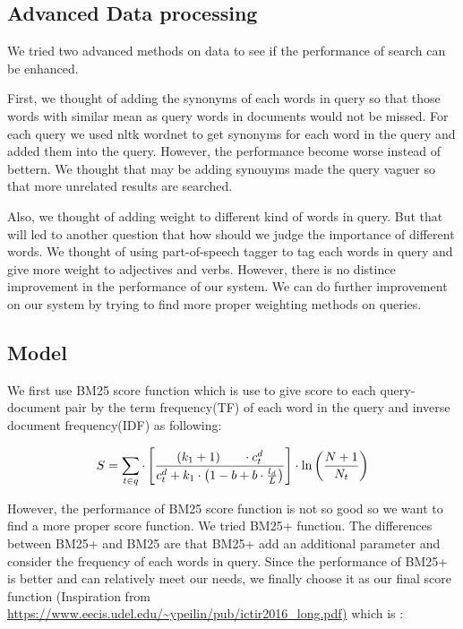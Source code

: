 \documentclass[letterpaper,10pt]{article}
\begin{document}
\begin{multicols}{2}
    \subsection{Advanced Data processing}

    We tried two advanced methods on data to see if the performance of search can be enhanced.
    
    First, we thought of adding the synonyms of each words in query so that those words with similar mean as query words in documents would not be missed. For each query we used nltk wordnet to get synonyms for each word in the query and added them into the query. However, the performance become worse instead of bettern. We thought that may be adding synouyms made the query vaguer so that more unrelated results are searched. 
    
    Also, we thought of adding weight to different kind of words in query. But that will led to another question that how should we judge the importance of different words. We thought of using part-of-speech tagger to tag each words in query and give more weight to adjectives and verbs. However, there is no distince improvement in the performance of our system. We can do further improvement on our system by trying to find more proper weighting methods on queries.

    \subsection{Model}
    
    We first use BM25 score function which is use to give score to each query-document pair by the term frequency(TF) of each word in the query and inverse document frequency(IDF) as following:
    
     {
    \tiny
    $$
        S = \sum_{t \in q} \cdot\left[\frac{\left(k_{1}+1\right) \\ \cdot c_{t}^{d}}{c_{t}^{d}+k_{1} \cdot\left(1-b+b \cdot \frac{l_{d}}{L}\right)}\right] \cdot \ln \left(\frac{N+1}{N_{t}}\right)
    $$
    }
    
    However, the performance of BM25 score function is not so good so we want to find a more proper score function. We tried BM25+ function. The differences between BM25+ and BM25 are that BM25+ add an additional parameter and consider the frequency of each words in query. Since the performance of BM25+ is better and can relatively meet our needs, we finally choose it as our final score function (Inspiration from \url{https://www.eecis.udel.edu/~ypeilin/pub/ictir2016_long.pdf)} which is :


\end{multicols}
\end{document}
